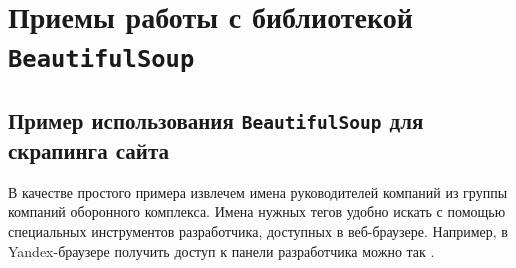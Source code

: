 \documentclass[%
	11pt,
	a4paper,
	utf8,
		]{article}
\begin{document}
\section{Приемы работы с библиотекой \texttt{BeautifulSoup}}

\subsection{Пример использования \texttt{BeautifulSoup} для скрапинга сайта}

В качестве простого примера извлечем имена руководителей компаний из группы компаний оборонного комплекса. Имена нужных тегов удобно искать с помощью специальных инструментов разработчика, доступных в веб-браузере. Например, в Yandex-браузере получить доступ к панели разработчика можно так .
\end{document}
